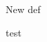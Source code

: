 \documentclass{standalone}
\begin{document}
\begin{defn*}{New def}
    \begin{ex}
       test 
    \end{ex}
\end{defn*}
\end{document}
